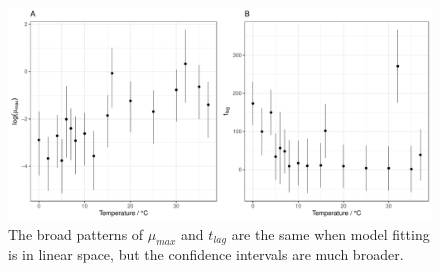 \documentclass[11pt, a4paper]{article}
\begin{document}
                                        \begin{figure}[H]
        \includegraphics[width=\linewidth]{../results/tlags_linear.pdf}
        \centering
        \caption{The broad patterns of $\mu_{max}$ and $t_{lag}$ are the same when model fitting is in linear space, but the confidence intervals are much broader.}
        \label{sup:params_linear}
        \end{figure} 
        
        
    
    
\end{document}

